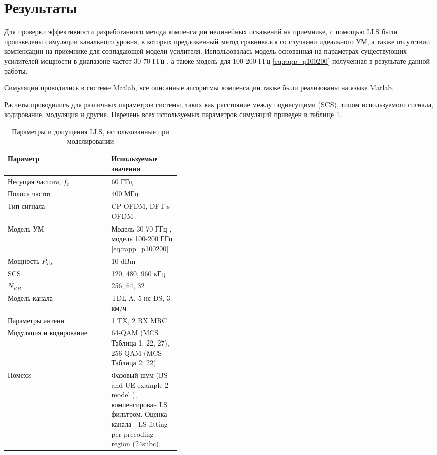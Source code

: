 \section{Результаты}
\label{sec:results}
Для проверки эффективности разработанного метода компенсации нелинейных
искажений на приемнике, с помощью LLS были произведены симуляции канального
уровня, в которых предложенный метод сравнивался со случаями идеального УМ,
а также отсутствии компенсации на приемнике для совпадающей модели
усилителя. Использовалась модель основанная на параметрах существующих
усилителей мощности в диапазоне частот 30-70 ГГц \cite{nokia163314}, а
также модель для 100-200 ГГц \ref{eq:rapp_p100200} полученная в результате
данной работы.

Симуляции проводились в системе Matlab, все описанные алгоритмы компенсации
также были реализованы на языке Matlab.

Расчеты проводились для различных параметров системы, таких как расстояние
между поднесущими (SCS), типом используемого сигнала, кодирование,
модуляция и другие. Перечень всех используемых параметров симуляций
приведен в таблице \ref{tab:lls_parameters}.
\begin{table}[h!]
    \centering
    \bgroup
    \def\arraystretch{1.5}
    \begin{tabular}{l|p{0.4\linewidth}}
    Параметр & Используемые значения \\ \hline
    Несущая частота, $f_c$ & 60 ГГц   \\ \hline
    Полоса частот &  400 МГц  \\ \hline
    Тип сигнала &  CP-OFDM, DFT-s-OFDM  \\ \hline
    Модель УМ  &  Модель 30-70 ГГц \cite{nokia163314}, модель 100-200 ГГц \ref{eq:rapp_p100200}   \\ \hline
    Мощность $P_{TX}$ &  10 dBm  \\ \hline
    SCS &  120, 480, 960 кГц  \\ \hline
    $N_{RB}$ &  256, 64, 32  \\ \hline
    Модель канала &  TDL-A, 5 нс DS, 3 км/ч  \\ \hline
    Параметры антенн &  1 TX, 2 RX MRC  \\ \hline
    Модуляция и кодирование &  64-QAM (MCS Таблица 1: 22, 27), 256-QAM (MCS Таблица 2: 22)  \\ \hline
    Помехи &  Фазовый шум (BS and UE example 2 model \cite{3gpp.38.803}),
    компенсирован LS фильтром. Оценка канала - LS fitting per precoding
    region (24subc)
    \end{tabular}
    \egroup
    \caption{Параметры и допущения LLS, использованные при моделировании}
    \label{tab:lls_parameters}
\end{table}

